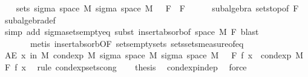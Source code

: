 \begin{isabellebody}
\ \ \isamarkupfalse%
\ {\isachardoublequoteopen}sets\ {\isacharparenleft}{\kern0pt}sigma\ {\isacharparenleft}{\kern0pt}space\ M{\isacharparenright}{\kern0pt}\ {\isacharparenleft}{\kern0pt}sigma\ {\isacharparenleft}{\kern0pt}space\ M{\isacharparenright}{\kern0pt}\ {\isacharbraceleft}{\kern0pt}{\isacharbraceright}{\kern0pt}\ {\isasymunion}\ F{\isacharparenright}{\kern0pt}{\isacharparenright}{\kern0pt}\ {\isacharequal}{\kern0pt}\ F{\isachardoublequoteclose}\isanewline
\ \ \ \ \isamarkupfalse%
\ subalgebra\ sets{\isachardot}{\kern0pt}top{\isacharbrackleft}{\kern0pt}of\ F{\isacharbrackright}{\kern0pt}\ \isamarkupfalse%
\ subalgebra{\isacharunderscore}{\kern0pt}def\ \isanewline
\ \ \ \ \isamarkupfalse%
\ {\isacharparenleft}{\kern0pt}simp\ add{\isacharcolon}{\kern0pt}\ sigma{\isacharunderscore}{\kern0pt}sets{\isacharunderscore}{\kern0pt}empty{\isacharunderscore}{\kern0pt}eq{\isacharcomma}{\kern0pt}\ subst\ insert{\isacharunderscore}{\kern0pt}absorb{\isacharbrackleft}{\kern0pt}of\ {\isachardoublequoteopen}space\ M{\isachardoublequoteclose}\ F{\isacharbrackright}{\kern0pt}{\isacharcomma}{\kern0pt}\ blast{\isacharparenright}{\kern0pt}\ \isanewline
\ \ \ \ \ \ \ {\isacharparenleft}{\kern0pt}metis\ insert{\isacharunderscore}{\kern0pt}absorb{\isacharbrackleft}{\kern0pt}OF\ sets{\isachardot}{\kern0pt}empty{\isacharunderscore}{\kern0pt}sets{\isacharbrackright}{\kern0pt}\ sets{\isachardot}{\kern0pt}sets{\isacharunderscore}{\kern0pt}measure{\isacharunderscore}{\kern0pt}of{\isacharunderscore}{\kern0pt}eq{\isacharparenright}{\kern0pt}\isanewline
\ \ \isamarkupfalse%
\ {\isachardoublequoteopen}AE\ x\ in\ M{\isachardot}{\kern0pt}\ cond{\isacharunderscore}{\kern0pt}exp\ M\ {\isacharparenleft}{\kern0pt}sigma\ {\isacharparenleft}{\kern0pt}space\ M{\isacharparenright}{\kern0pt}\ {\isacharparenleft}{\kern0pt}sigma\ {\isacharparenleft}{\kern0pt}space\ M{\isacharparenright}{\kern0pt}\ {\isacharbraceleft}{\kern0pt}{\isacharbraceright}{\kern0pt}\ {\isasymunion}\ F{\isacharparenright}{\kern0pt}{\isacharparenright}{\kern0pt}\ f\ x\ {\isacharequal}{\kern0pt}\ cond{\isacharunderscore}{\kern0pt}exp\ M\ F\ f\ x{\isachardoublequoteclose}\ \isamarkupfalse%
\ {\isacharparenleft}{\kern0pt}rule\ cond{\isacharunderscore}{\kern0pt}exp{\isacharunderscore}{\kern0pt}sets{\isacharunderscore}{\kern0pt}cong{\isacharparenright}{\kern0pt}\isanewline
\ \ \isamarkupfalse%
\ {\isacharquery}{\kern0pt}thesis\ \isamarkupfalse%
\ cond{\isacharunderscore}{\kern0pt}exp{\isacharunderscore}{\kern0pt}indep\ \isamarkupfalse%
\ force\isanewline
{}\isamarkupfalse%
%
\endisatagproof
{\isafoldproof}%
%
\isadelimproof
\isanewline
%
\endisadelimproof
%
\isadelimtheory
\isanewline
%
\endisadelimtheory
%
\isatagtheory
{}\isamarkupfalse%
%
\endisatagtheory
{\isafoldtheory}%
%
\isadelimtheory
%
\endisadelimtheory
%
\end{isabellebody}%
